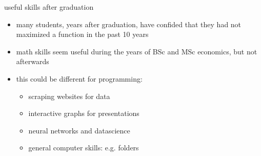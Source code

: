 \documentclass[presentation]{beamer}
\begin{document}
\begin{frame}[label={sec:org52e97e5}]{useful skills after graduation}
\begin{itemize}
\item many students, years after graduation, have confided that they had not maximized a function in the past 10 years
\item math skills seem useful during the years of BSc and MSc economics, but not afterwards
\item this could be different for programming:
\begin{itemize}
\item scraping websites for data
\item interactive graphs for presentations
\item neural networks and datascience
\item general computer skills: e.g. folders
\end{itemize}
\end{itemize}
\end{frame}
\end{document}
